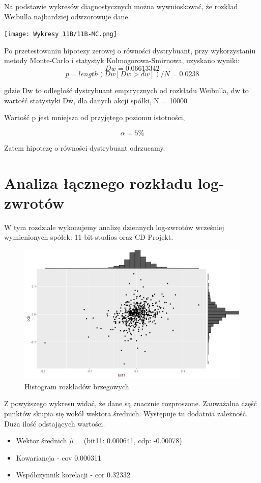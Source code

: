 \documentclass[a4paper,11pt]{article}
\def\\{\hfill\break}
\begin{document}
Na podstawie wykresów diagnostycznych można wywnioskować, że rozkład Weibulla najbardziej odwzorowuje dane.



\newpage
\centerline{\texttt{[image: Wykresy 11B/11B-MC.png]}}

Po przetestowaniu hipotezy zerowej o równości dystrybuant, przy wykorzystaniu metody Monte-Carlo i statystyk Kołmogorowa-Smirnowa, uzyskano wyniki:
  $$ Dw = 0.06613342 $$
  $$p = length(Dw[Dw>dw])/N = 0.0238$$ 

gdzie Dw to odległość dystrybuant empirycznych od rozkładu Weibulla, dw to wartość statystyki Dw, dla danych akcji spółki, N = 10000

\\
Wartość p jest mniejsza od przyjętego poziomu istotności,

   $$ \alpha  = 5\%$$

Zatem hipotezę o równości dystrybuant odrzucamy.





\newpage


\section{Analiza łącznego rozkładu log-zwrotów}
W tym rozdziale wykonujemy analizę dziennych log-zwrotów wcześniej wymienionych spółek: 11 bit studios oraz CD Projekt. 
\begin{figure}[H]
    \includegraphics[width=12cm]{Wykresy/Histogram_rozkladow_brzegowych.png}
    \caption{Histogram rozkładów brzegowych}
    \label{Histogram_rozkladow_brzegowych}
\end{figure}
Z powyższego wykresu widać, że dane są znacznie rozproszone. Zauważalna część punktów skupia się wokół wektora średnich. Występuje tu dodatnia zależność. Duża ilość odstających wartości.
\begin{itemize}
  \item Wektor średnich $\hat{\mu}$ = (bit11: 0.000641, cdp: -0.00078)
  \item Kowariancja - cov 0.000311
  \item Współczynnik korelacji - cor 0.32332
\end{itemize} 
\end{document}
